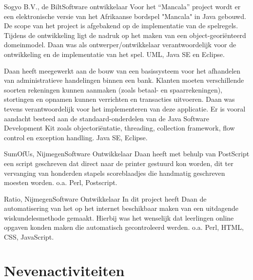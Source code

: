 \begin{workExperience}{Sogyo B.V., de Bilt}{Software ontwikkelaar}{}
		Voor het ``Mancala'' project wordt er een elektronische versie van het 
		Afrikaanse bordspel "Mancala" in Java gebouwd. De scope van het 
		project is afgebakend op de implementatie van de spelregels. Tijdens
		de ontwikkeling ligt de nadruk op het maken van een 
		object-geori\"enteerd domeinmodel. Daan was als ontwerper/ontwikkelaar
		verantwoordelijk voor de ontwikkeling en de implementatie van het 
		spel.
		\technics UML, Java SE en Eclipse.
		
		Daan heeft meegewerkt aan de bouw van een basissysteem voor het 
		afhandelen van administratieve handelingen binnen een bank. Klanten 
		moeten verschillende soorten rekeningen kunnen aanmaken (zoals betaal- 
		en spaarrekeningen), stortingen en opnamen kunnen verrichten en 
		transacties uitvoeren. Daan was tevens verantwoordelijk voor het 
		implementeren van deze applicatie. 
		Er is vooral aandacht besteed aan de standaard-onderdelen van de Java 
		Software Development Kit zoals objectori\"entatie, threading, collection 
		framework, flow control en exception handling.
		\technics Java SE, Eclipse. 
	\end{workExperience}
	
	\begin{workExperience}{SumOfUs, Nijmegen}{Software Ontwikkelaar}{}
		Daan heeft met behulp van PostScript een script geschreven dat direct 
		naar de printer gestuurd kon worden, dit ter vervanging van honderden 
		stapels scoreblaadjes die handmatig geschreven moesten worden.
		\technics o.a. Perl, Postscript.
	\end{workExperience}

	\begin{workExperience}{Ratio, Nijmegen}{Software Ontwikkelaar}{}
		In dit project heeft Daan de automatisering van het op het internet 
		beschikbaar maken van een uitdagende wiskundelesmethode gemaakt. Hierbij
		was het wenselijk dat leerlingen online opgaven konden maken die 
		automatisch gecontroleerd werden.
		\technics o.a. Perl, HTML, CSS, JavaScript.	
	\end{workExperience}

\section*{Nevenactiviteiten}

